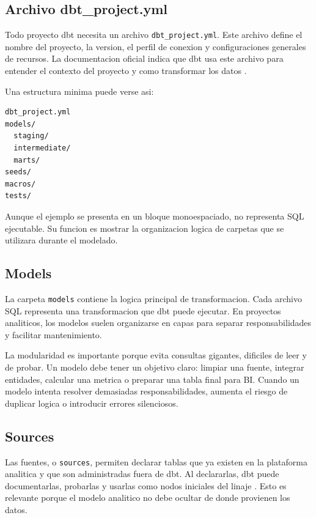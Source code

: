 \documentclass[12pt]{article}
\begin{document}
\subsection{Archivo dbt\_project.yml}
Todo proyecto dbt necesita un archivo \texttt{dbt\_project.yml}. Este archivo define el nombre del proyecto, la version, el perfil de conexion y configuraciones generales de recursos. La documentacion oficial indica que dbt usa este archivo para entender el contexto del proyecto y como transformar los datos \cite{dbt_projects}.

Una estructura minima puede verse asi:

\begin{lstlisting}[style=sql, caption={Estructura conceptual de un proyecto dbt}]
dbt_project.yml
models/
  staging/
  intermediate/
  marts/
seeds/
macros/
tests/
\end{lstlisting}

Aunque el ejemplo se presenta en un bloque monoespaciado, no representa SQL ejecutable. Su funcion es mostrar la organizacion logica de carpetas que se utilizara durante el modelado.

\subsection{Models}
La carpeta \texttt{models} contiene la logica principal de transformacion. Cada archivo SQL representa una transformacion que dbt puede ejecutar. En proyectos analiticos, los modelos suelen organizarse en capas para separar responsabilidades y facilitar mantenimiento.

La modularidad es importante porque evita consultas gigantes, dificiles de leer y de probar. Un modelo debe tener un objetivo claro: limpiar una fuente, integrar entidades, calcular una metrica o preparar una tabla final para BI. Cuando un modelo intenta resolver demasiadas responsabilidades, aumenta el riesgo de duplicar logica o introducir errores silenciosos.

\subsection{Sources}
Las fuentes, o \texttt{sources}, permiten declarar tablas que ya existen en la plataforma analitica y que son administradas fuera de dbt. Al declararlas, dbt puede documentarlas, probarlas y usarlas como nodos iniciales del linaje \cite{dbt_sources}. Esto es relevante porque el modelo analitico no debe ocultar de donde provienen los datos.
\end{document}
